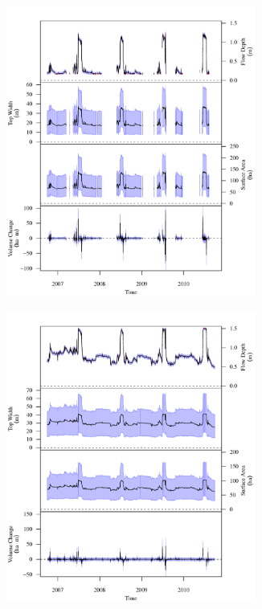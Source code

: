 \subfiguretop
\begin{landscape}
	\begin{figure}
		\begin{subfigure}{0.7\textwidth}
			\centering
			\includegraphics[width=0.9\textwidth]{"Figures/Results_DSR/Stochastic/G TS F"}
		\end{subfigure}%
		\begin{subfigure}{0.7\textwidth}
			\centering
			\includegraphics[width=0.9\textwidth]{"Figures/Results_DSR/Stochastic/G TS G"}

\end{subfigure}
\end{figure}
\end{landscape}
